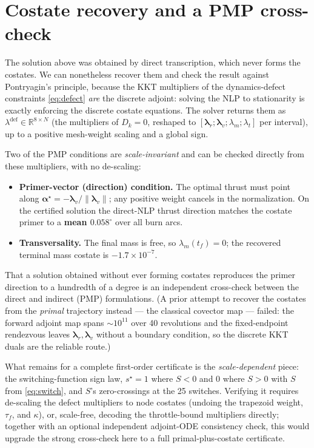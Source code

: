 \documentclass[11pt]{article}
\newcommand{\vv}[1]{\boldsymbol{#1}}
\newcommand{\lam}{\vv{\lambda}}
\newcommand{\R}{\mathbb{R}}
\begin{document}
\section{Costate recovery and a PMP cross-check}
\label{sec:pmp}
The solution above was obtained by direct transcription, which never forms the
costates. We can nonetheless recover them and check the result against
Pontryagin's principle, because the KKT multipliers of the dynamics-defect
constraints \eqref{eq:defect} \emph{are} the discrete adjoint: solving the NLP
to stationarity is exactly enforcing the discrete costate equations. The solver
returns them as $\lambda^{\mathrm{def}}\in\R^{8\times N}$ (the multipliers of
$D_k=0$, reshaped to $[\lam_r;\lam_v;\lambda_m;\lambda_t]$ per interval), up to a
positive mesh-weight scaling and a global sign.

Two of the PMP conditions are \emph{scale-invariant} and can be checked directly
from these multipliers, with no de-scaling:
\begin{itemize}[leftmargin=1.4em,itemsep=1pt]
\item \textbf{Primer-vector (direction) condition.} The optimal thrust must point
  along $\vv\alpha^\star=-\lam_v/\lVert\lam_v\rVert$; any positive weight cancels
  in the normalization. On the certified solution the direct-NLP thrust direction
  matches the costate primer to a \textbf{mean $0.058^\circ$} over all burn arcs.
\item \textbf{Transversality.} The final mass is free, so $\lambda_m(t_f)=0$;
  the recovered terminal mass costate is $-1.7\times10^{-7}$.
\end{itemize}
That a solution obtained without ever forming costates reproduces the primer
direction to a hundredth of a degree is an independent cross-check between the
direct and indirect (PMP) formulations. (A prior attempt to recover the costates
from the \emph{primal} trajectory instead — the classical covector map — failed:
the forward adjoint map spans ${\sim}10^{11}$ over 40 revolutions and the
fixed-endpoint rendezvous leaves $\lam_r,\lam_v$ without a boundary condition, so
the discrete KKT duals are the reliable route.)

What remains for a complete first-order certificate is the \emph{scale-dependent}
piece: the switching-function sign law, $s^\star=1$ where $S<0$ and $0$ where
$S>0$ with $S$ from \eqref{eq:switch}, and $S$'s zero-crossings at the 25
switches. Verifying it requires de-scaling the defect multipliers to node
costates (undoing the trapezoid weight, $\tau_f$, and $\kappa$), or, scale-free,
decoding the throttle-bound multipliers directly; together with an optional
independent adjoint-ODE consistency check, this would upgrade the strong
cross-check here to a full primal-plus-costate certificate.
\end{document}
